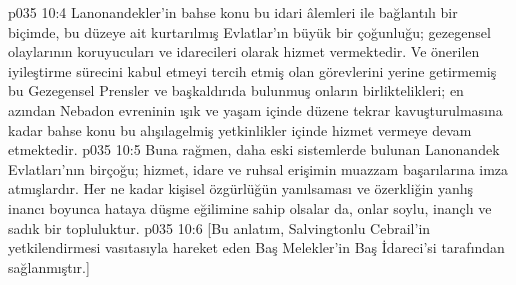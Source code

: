 \vs p035 10:4 Lanonandekler’in bahse konu bu idari âlemleri ile bağlantılı bir biçimde, bu düzeye ait kurtarılmış Evlatlar’ın büyük bir çoğunluğu; gezegensel olaylarının koruyucuları ve idarecileri olarak hizmet vermektedir. Ve önerilen iyileştirme sürecini kabul etmeyi tercih etmiş olan görevlerini yerine getirmemiş bu Gezegensel Prensler ve başkaldırıda bulunmuş onların birliktelikleri; en azından Nebadon evreninin ışık ve yaşam içinde düzene tekrar kavuşturulmasına kadar bahse konu bu alışılagelmiş yetkinlikler içinde hizmet vermeye devam etmektedir.
\vs p035 10:5 Buna rağmen, daha eski sistemlerde bulunan Lanonandek Evlatları’nın birçoğu; hizmet, idare ve ruhsal erişimin muazzam başarılarına imza atmışlardır. Her ne kadar kişisel özgürlüğün yanılsaması ve özerkliğin yanlış inancı boyunca hataya düşme eğilimine sahip olsalar da, onlar soylu, inançlı ve sadık bir topluluktur.
\vs p035 10:6 [Bu anlatım, Salvingtonlu Cebrail’in yetkilendirmesi vasıtasıyla hareket eden Baş Melekler’in Baş İdareci’si tarafından sağlanmıştır.]
